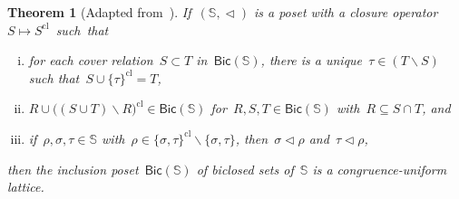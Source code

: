 \documentclass{amsart}
\newtheorem{theorem}{Theorem}[part]
\theoremstyle{definition}
\newcommand{\cS}{\mathbb{S}} %
\newcommand{\ssm}{\smallsetminus} %
\newcommand{\closure}[1]{#1^{\mathrm{cl}}} %
\newcommand{\Bicl}[1]{\mathsf{Bic}(#1)} %
\begin{document}
\begin{theorem}[Adapted from~{\cite[Thm.~5.2 \& Thm.~5.5]{McConville}}]
\label{thm:characterizationCongruenceUniform2}
If~$(\cS, \vartriangleleft)$ is a poset with a closure operator~$S \mapsto \closure{S}$~such~that
\begin{enumerate}[(i)]
\item for each cover relation~$S \subset T$ in~$\Bicl{\cS}$, there is a unique~$\tau \in (T \ssm S)$ such that~${S \cup \closure{\{\tau\}} = T}$,
\item $R \cup \closure{\big((S \cup T) \ssm R\big)} \in \Bicl{\cS}$ for~$R,S,T \in \Bicl{\cS}$ with~$R \subseteq S \cap T$, and
\item if~$\rho,\sigma,\tau \in \cS$ with~$\rho \in \closure{\{\sigma,\tau\}} \ssm \{\sigma,\tau\}$, then~$\sigma \vartriangleleft \rho$ and~$\tau \vartriangleleft \rho$,
\end{enumerate}
then the inclusion poset~$\Bicl{\cS}$ of biclosed sets of~$\cS$ is a congruence-uniform lattice.
\end{theorem}
\end{document}
